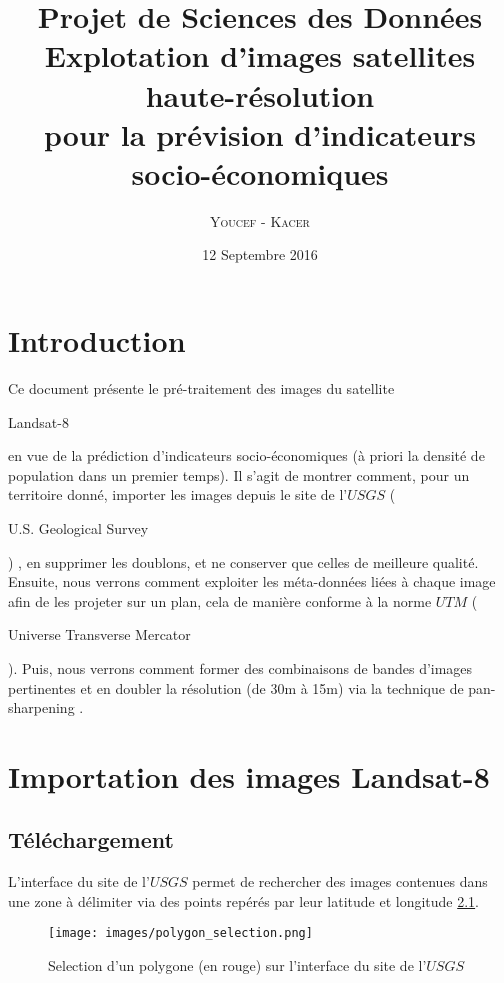\documentclass{book}
\title{%
  Projet de Sciences des Données \\
  \large Explotation d'images satellites haute-résolution \\pour la prévision d'indicateurs socio-économiques \\
    }
\author{\textsc{Youcef} - \textsc{Kacer}}
\date{12 Septembre 2016}
\begin{document}
 
\maketitle

\tableofcontents

\frontmatter
\chapter{Introduction}
Ce document présente le pré-traitement des images du satellite \begin{itshape}Landsat-8\end{itshape} en vue de la prédiction d'indicateurs socio-économiques (à 
priori la densité de population dans un premier temps). Il s'agit de montrer comment, pour un territoire donné,
importer les images depuis le site de l'$USGS$ (\begin{itshape}U.S. Geological Survey\end{itshape}) \cite{landsat8}, en supprimer les doublons, et ne conserver 
que celles de meilleure qualité.
Ensuite, nous verrons comment exploiter les méta-données liées à chaque image afin de les projeter sur un plan, cela de manière conforme
à la norme $UTM$ (\begin{itshape}Universe Transverse Mercator\end{itshape}).
Puis, nous verrons comment former des combinaisons de bandes d'images pertinentes et en doubler la résolution (de 30m à 15m) via
la technique de \og pan-sharpening \fg{}.
\mainmatter

\chapter{Importation des images Landsat-8}
\section{Téléchargement}

L'interface du site de l'$USGS$ permet de rechercher des images contenues dans une zone à délimiter via des points repérés par 
leur latitude et longitude \ref{selection}.\\

\begin{figure}[H]
\begin{center}
\texttt{[image: images/polygon\_selection.png]}
\end{center}
\caption{Selection d'un polygone (en rouge) sur l'interface du site de l'$USGS$}
\label{selection}
\end{figure}
\end{document}
